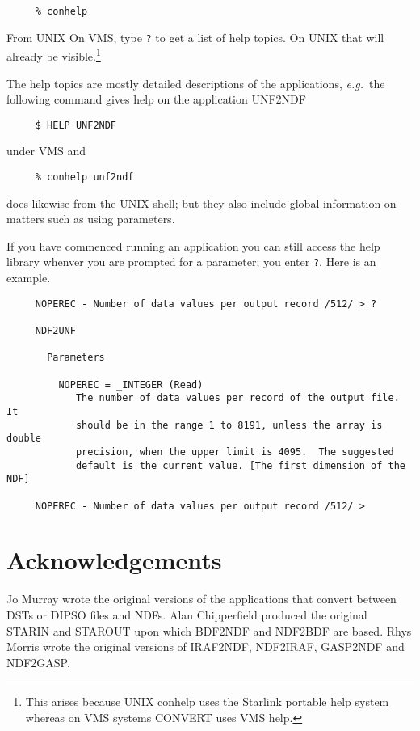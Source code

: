 \vspace{-\bigskipamount}
\small
\begin{verbatim}
     % conhelp
\end{verbatim}
\normalsize
  From UNIX
On VMS, type {\tt ?} to get a list of
help topics.  On UNIX that will already be visible.\footnote{This
arises because UNIX conhelp uses the Starlink portable help system
whereas on VMS systems CONVERT uses VMS help.} 

The help topics are mostly detailed descriptions of the applications,
{\it e.g.}\ the following command gives help on the application UNF2NDF

\small
\begin{verbatim}
     $ HELP UNF2NDF
\end{verbatim}
\normalsize
under VMS and

\small
\begin{verbatim}
     % conhelp unf2ndf
\end{verbatim}
\normalsize
does likewise from the UNIX shell; but they also include global
information on matters such as using parameters. 

If you have commenced running an application you can still access the
help library whenver you are prompted for a parameter; you enter {\tt ?}.
Here is an example.

\small
\begin{verbatim}
     NOPEREC - Number of data values per output record /512/ > ?

     NDF2UNF

       Parameters

         NOPEREC = _INTEGER (Read)
            The number of data values per record of the output file.  It
            should be in the range 1 to 8191, unless the array is double
            precision, when the upper limit is 4095.  The suggested
            default is the current value. [The first dimension of the NDF]

     NOPEREC - Number of data values per output record /512/ > 
\end{verbatim}
\normalsize
 
\section{Acknowledgements}
Jo Murray wrote the original versions of the applications that convert
between DSTs or DIPSO files and NDFs.  Alan Chipperfield produced the
original STARIN and STAROUT upon which BDF2NDF and NDF2BDF are based.
Rhys Morris wrote the original versions of IRAF2NDF, NDF2IRAF, GASP2NDF
and NDF2GASP.

